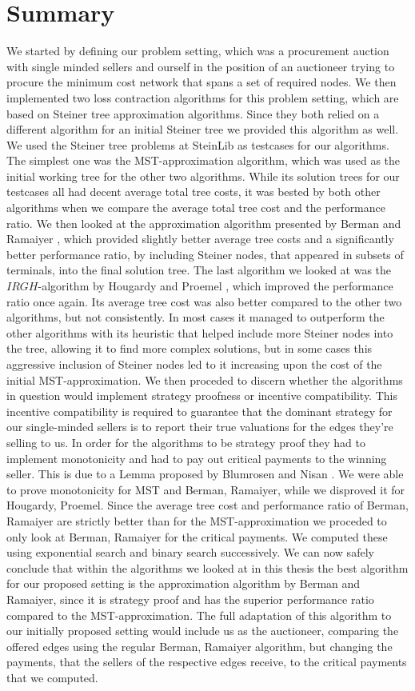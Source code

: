 
\chapter{Summary}\label{chapter:conclusion}

We started by defining our problem setting, which was a procurement auction with single minded sellers and ourself in the position of an auctioneer trying to procure the minimum cost network that spans a set of required nodes. We then implemented two loss contraction algorithms for this problem setting, which are based on Steiner tree approximation algorithms. Since they both relied on a different algorithm for an initial Steiner tree we provided this algorithm as well. We used the Steiner tree problems at SteinLib \cite{Dui93} as testcases for our algorithms. The simplest one was the MST-approximation algorithm, which was used as the initial working tree for the other two algorithms. While its solution trees for our testcases all had decent average total tree costs, it was bested by both other algorithms when we compare the average total tree cost and the performance ratio. We then looked at the approximation algorithm presented by Berman and Ramaiyer \cite{BeRa94}, which provided slightly better average tree costs and a significantly better performance ratio, by including Steiner nodes, that appeared in subsets of terminals, into the final solution tree. The last algorithm we looked at was the $IRGH$-algorithm by Hougardy and Proemel \cite{HoPr99}, which improved the performance ratio once again. Its average tree cost was also better compared to the other two algorithms, but not consistently. In most cases it managed to outperform the other algorithms with its heuristic that helped include more Steiner nodes into the tree, allowing it to find more complex solutions, but in some cases this aggressive inclusion of Steiner nodes led to it increasing upon the cost of the initial MST-approximation. We then proceded to discern whether the algorithms in question would implement strategy proofness or incentive compatibility. This incentive compatibility is required to guarantee that the dominant strategy for our single-minded sellers is to report their true valuations for the edges they're selling to us. In order for the algorithms to be strategy proof they had to implement monotonicity and had to pay out critical payments to the winning seller. This is due to a Lemma proposed by Blumrosen and Nisan \cite{BlNi07}. We were able to prove monotonicity for MST and Berman, Ramaiyer, while we disproved it for Hougardy, Proemel. Since the average tree cost and performance ratio of Berman, Ramaiyer are strictly better than for the MST-approximation we proceded to only look at Berman, Ramaiyer for the critical payments. We computed these using exponential search and binary search successively. We can now safely conclude that within the algorithms we looked at in this thesis the best algorithm for our proposed setting is the approximation algorithm by Berman and Ramaiyer, since it is strategy proof and has the superior performance ratio compared to the MST-approximation. The full adaptation of this algorithm to our initially proposed setting would include us as the auctioneer, comparing the offered edges using the regular Berman, Ramaiyer algorithm, but changing the payments, that the sellers of the respective edges receive, to the critical payments that we computed.  
